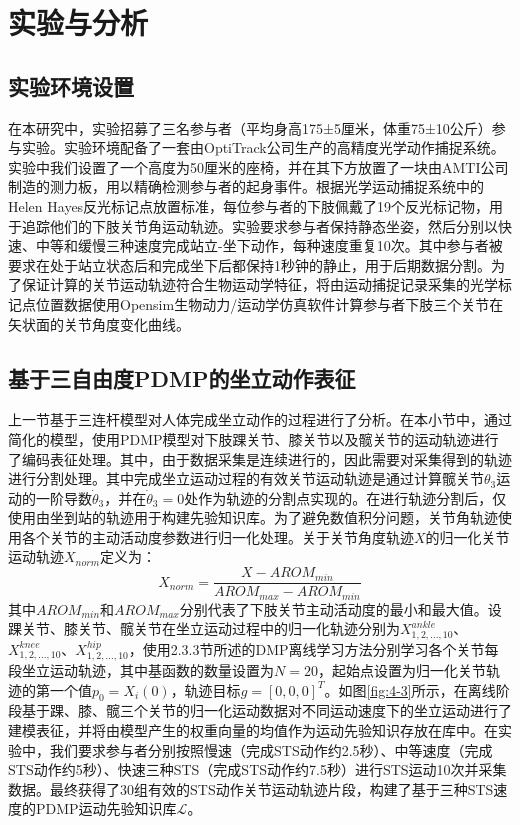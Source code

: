\section{实验与分析}
\subsection{实验环境设置} 
在本研究中，实验招募了三名参与者（平均身高175±5厘米，体重75±10公斤）参与实验。实验环境配备了一套由OptiTrack公司生产的高精度光学动作捕捉系统。实验中我们设置了一个高度为50厘米的座椅，并在其下方放置了一块由AMTI公司制造的测力板，用以精确检测参与者的起身事件。根据光学运动捕捉系统中的Helen Hayes反光标记点放置标准，每位参与者的下肢佩戴了19个反光标记物，用于追踪他们的下肢关节角运动轨迹。实验要求参与者保持静态坐姿，然后分别以快速、中等和缓慢三种速度完成站立-坐下动作，每种速度重复10次。其中参与者被要求在处于站立状态后和完成坐下后都保持1秒钟的静止，用于后期数据分割。为了保证计算的关节运动轨迹符合生物运动学特征，将由运动捕捉记录采集的光学标记点位置数据使用Opensim生物动力/运动学仿真软件计算参与者下肢三个关节在矢状面的关节角度变化曲线。

\subsection{基于三自由度PDMP的坐立动作表征} 
上一节基于三连杆模型对人体完成坐立动作的过程进行了分析。在本小节中，通过简化的模型，使用PDMP模型对下肢踝关节、膝关节以及髋关节的运动轨迹进行了编码表征处理。其中，由于数据采集是连续进行的，因此需要对采集得到的轨迹进行分割处理。其中完成坐立运动过程的有效关节运动轨迹是通过计算髋关节$\theta_3$运动的一阶导数$\dot\theta_3$，并在$\dot\theta_3=0$处作为轨迹的分割点实现的。在进行轨迹分割后，仅使用由坐到站的轨迹用于构建先验知识库。为了避免数值积分问题，关节角轨迹使用各个关节的主动活动度参数进行归一化处理。关于关节角度轨迹$X$的归一化关节运动轨迹$X_{norm}$定义为：
\begin{equation}
    X_{norm} = \frac{X-AROM_{min}}{AROM_{max}-AROM_{min}}
    \label{eq:4-39}
\end{equation}
其中$AROM_{min}$和$AROM_{max}$分别代表了下肢关节主动活动度的最小和最大值。设踝关节、膝关节、髋关节在坐立运动过程中的归一化轨迹分别为$X_{1,2,...,10}^{ankle}$、$X_{1,2,...,10}^{knee}$、$X_{1,2,...,10}^{hip}$，使用2.3.3节所述的DMP离线学习方法分别学习各个关节每段坐立运动轨迹，其中基函数的数量设置为$N=20$，起始点设置为归一化关节轨迹的第一个值$p_0=X_i(0)$，轨迹目标$g=[0,0,0]^T$。如图\ref{fig:4-3}所示，在离线阶段基于踝、膝、髋三个关节的归一化运动数据对不同运动速度下的坐立运动进行了建模表征，并将由模型产生的权重向量的均值作为运动先验知识存放在库中。在实验中，我们要求参与者分别按照慢速（完成STS动作约2.5秒）、中等速度（完成STS动作约5秒）、快速三种STS（完成STS动作约7.5秒）进行STS运动10次并采集数据。最终获得了30组有效的STS动作关节运动轨迹片段，构建了基于三种STS速度的PDMP运动先验知识库$\mathscr{L}$。

